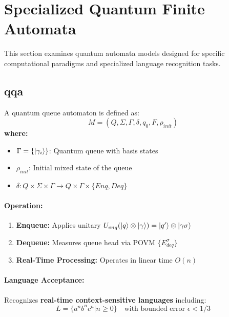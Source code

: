 \section{Specialized Quantum Finite Automata}
\label{sec:specialized-qfa}

This section examines quantum automata models designed for specific computational paradigms and specialized language recognition tasks.

\subsection{\acrfull{qqa}}
\label{subsec:qqa}

\begin{definition}
A quantum queue automaton is defined as:
\[
M = (Q, \Sigma, \Gamma, \delta, q_0, F, \rho_{init})
\]
\textbf{where:}
\begin{itemize}
    \item $\Gamma = \{\ket{\gamma_i}\}$: Quantum queue with basis states
    \item $\rho_{init}$: Initial mixed state of the queue
    \item $\delta: Q \times \Sigma \times \Gamma \rightarrow Q \times \Gamma \times \{Enq, Deq\}$
\end{itemize}
\end{definition}

\paragraph{Operation:}
\begin{enumerate}
    \item \textbf{Enqueue:} Applies unitary $U_{enq}(\ket{q}\otimes\ket{\gamma}) = \ket{q'}\otimes\ket{\gamma\sigma}$
    \item \textbf{Dequeue:} Measures queue head via POVM $\{E_{deq}^\sigma\}$
    \item \textbf{Real-Time Processing:} Operates in linear time $O(n)$ \cite{seegulnaja2010postselection}
\end{enumerate}

\paragraph{Language Acceptance:}
Recognizes \textbf{real-time context-sensitive languages} including:
\[
L = \{a^nb^nc^n | n \geq 0\} \quad \text{with bounded error } \epsilon < 1/3
\]

